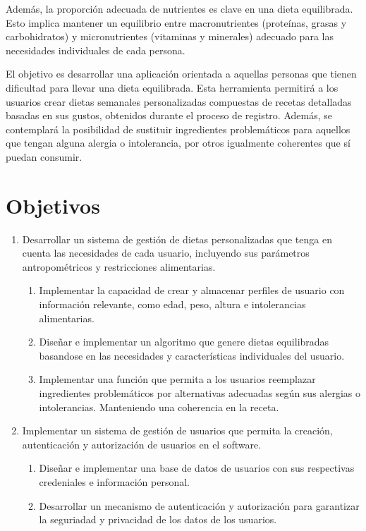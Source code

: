 Además, la proporción adecuada de nutrientes es clave en una dieta equilibrada. Esto implica mantener un equilibrio entre macronutrientes (proteínas, grasas y carbohidratos) y micronutrientes (vitaminas y minerales) adecuado para las necesidades individuales de cada persona.

El objetivo es desarrollar una aplicación orientada a aquellas personas que tienen dificultad para llevar una dieta equilibrada. Esta herramienta permitirá a los usuarios crear dietas semanales personalizadas compuestas de recetas detalladas basadas en sus gustos, obtenidos durante el proceso de registro. Además, se contemplará la posibilidad de sustituir ingredientes problemáticos para aquellos que tengan alguna alergia o intolerancia, por otros igualmente coherentes que sí puedan consumir.

\section{Objetivos}
\begin{enumerate}
    \item Desarrollar un sistema de gestión de dietas personalizadas que tenga en cuenta las necesidades de cada usuario, incluyendo sus parámetros antropométricos y restricciones alimentarias.
    \begin{enumerate}
        \item Implementar la capacidad de crear y almacenar perfiles de usuario con información relevante, como edad, peso, altura e intolerancias alimentarias.
        \item Diseñar e implementar un algoritmo que genere dietas equilibradas basandose en las necesidades y características individuales del usuario.
        \item Implementar una función que permita a los usuarios reemplazar ingredientes problemáticos por alternativas adecuadas según sus alergias o intolerancias. Manteniendo una coherencia en la receta.
    \end{enumerate}
    \item Implementar un sistema de gestión de usuarios que permita la creación, autenticación y autorización de usuarios en el software. 
    \begin{enumerate}
        \item Diseñar e implementar una base de datos de usuarios con sus respectivas credeniales e información personal. 
        \item Desarrollar un mecanismo de autenticación y autorización para garantizar la seguriadad y privacidad de los datos de los usuarios.
    \end{enumerate}
\end{enumerate}